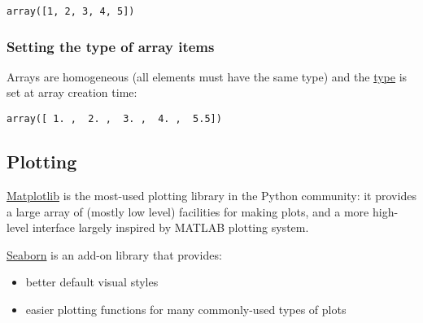 \documentclass[english,serif,mathserif,xcolor=pdftex,dvipsnames,table]{beamer}
\begin{document}
\begin{Shaded}
\begin{Highlighting}[]
\end{Highlighting}
\end{Shaded}

\begin{verbatim}
array([1, 2, 3, 4, 5])
\end{verbatim}

\subsubsection{Setting the type of array
items}\label{setting-the-type-of-array-items}

Arrays are homogeneous (all elements must have the same type) and the
\href{https://docs.scipy.org/doc/numpy/user/basics.types.html}{type} is
set at array creation time:

\begin{Shaded}
\begin{Highlighting}[]
\OperatorTok{=} \NormalTok{np.array([}\NormalTok{, }\NormalTok{, }\NormalTok{, }\NormalTok{, }\NormalTok{], dtype}\OperatorTok{=}

\NormalTok{a[}\NormalTok{] }\OperatorTok{=} 

\end{Highlighting}
\end{Shaded}

\begin{verbatim}
array([ 1. ,  2. ,  3. ,  4. ,  5.5])
\end{verbatim}

\subsection{Plotting}\label{plotting}

\href{http://matplotlib.org/gallery.html}{Matplotlib} is the most-used
plotting library in the Python community: it provides a large array of
(mostly low level) facilities for making plots, and a more high-level
interface largely inspired by MATLAB plotting system.

\href{http://seaborn.pydata.org/index.html}{Seaborn} is an add-on
library that provides:

\begin{itemize}
\tightlist
\item
  better default visual styles
\item
  easier plotting functions for many commonly-used types of plots
\end{itemize}
\end{document}

